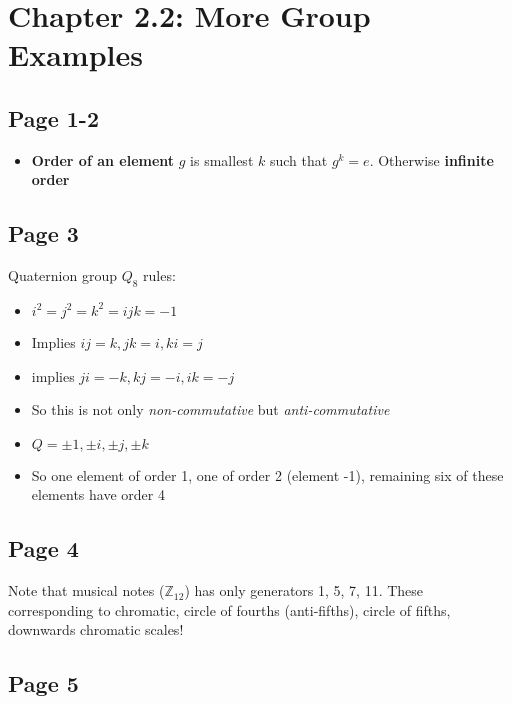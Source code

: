 \documentclass[11pt, oneside]{article}   	%
\begin{document}
\section {Chapter 2.2: More Group Examples}

\subsection {Page 1-2}

\begin{itemize}
\item \textbf{Order of an element} $g$ is smallest $k$ such that $g^k = e$.  Otherwise \textbf{infinite order}
\end{itemize}

\subsection {Page 3}

Quaternion group $Q_8$ rules:

\begin{itemize}
\item $i^2 = j^2 = k^2 = ijk =  - 1$
\item Implies $ij = k, jk = i, ki = j$
\item implies $ji = -k, kj = -i, ik = -j$
\item So this is not only \emph{non-commutative} but \emph{anti-commutative}
\item $Q = {\pm 1, \pm i, \pm j, \pm k}$
\item So one element of order 1, one of order 2 (element -1), remaining six of these elements have order 4
\end{itemize}

\subsection {Page 4}

Note that  musical notes ($\mathbb{Z}_{12}$) has only generators 1, 5, 7, 11.  
These corresponding to chromatic, circle of fourths (anti-fifths), circle of fifths, downwards chromatic scales!

\subsection {Page 5}
\end{document}
